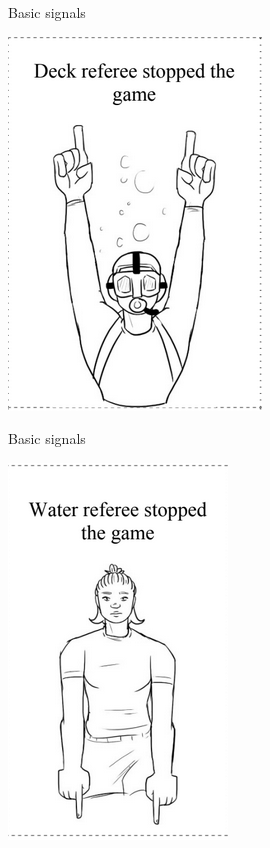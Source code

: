 \begin{frame}{Basic signals}
    \begin{center}
        \includegraphics[scale=0.8]{surfaceRefSignal}
    \end{center}
\end{frame}

\begin{frame}{Basic signals}
    \begin{center}
        \includegraphics[scale=0.8]{waterRefSignal}
    \end{center}
\end{frame}

